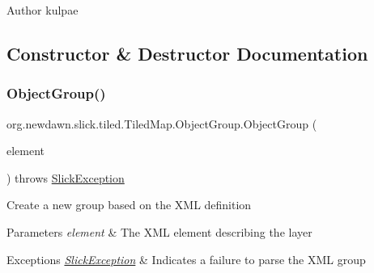 \begin{DoxyAuthor}{Author}
kulpae 
\end{DoxyAuthor}


\subsection{Constructor \& Destructor Documentation}
\mbox{\label{classorg_1_1newdawn_1_1slick_1_1tiled_1_1_tiled_map_1_1_object_group_a2030b1cef151fcb6a2185e1aa9de571a}} 
\subsubsection{\texorpdfstring{Object\+Group()}{ObjectGroup()}}
{\footnotesize\ttfamily org.\+newdawn.\+slick.\+tiled.\+Tiled\+Map.\+Object\+Group.\+Object\+Group (\begin{DoxyParamCaption}\item[{Element}]{element }\end{DoxyParamCaption}) throws \mbox{\hyperlink{classorg_1_1newdawn_1_1slick_1_1_slick_exception}{Slick\+Exception}}\hspace{0.3cm}{\ttfamily [inline]}}

Create a new group based on the X\+ML definition


\begin{DoxyParams}{Parameters}
{\em element} & The X\+ML element describing the layer \\
\hline
\end{DoxyParams}

\begin{DoxyExceptions}{Exceptions}
{\em \mbox{\hyperlink{classorg_1_1newdawn_1_1slick_1_1_slick_exception}{Slick\+Exception}}} & Indicates a failure to parse the X\+ML group \\
\hline
\end{DoxyExceptions}

